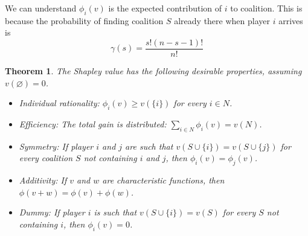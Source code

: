 \documentclass[12pt]{article}
\newtheorem{theorem}{Theorem}[section]
\theoremstyle{definition}
\begin{document}
We can understand $\phi_i(v)$ is the expected contribution of $i$ to coalition. This is because the probability of finding coalition $S$ already there when player $i$ arrives is
\[
\gamma(s)=\frac{s!(n-s-1)!}{n!}
\]
\begin{theorem}\normalfont The Shapley value has the following desirable properties, assuming $v(\varnothing)=0$.
\begin{itemize}
  \item Individual rationality: $\phi_i(v)\geq v(\{i\})$ for every $i\in N$.
  \item Efficiency: The total gain is distributed: $\sum_{i\in N}\phi_i(v)=v(N)$.
  \item Symmetry: If player $i$ and $j$ are such that $v(S\cup\{i\})=v(S\cup\{j\})$ for every coalition $S$ not containing $i$ and $j$, then $\phi_i(v)=\phi_j(v)$.
  \item Additivity: If $v$ and $w$ are characteristic functions, then $\phi(v+w)=\phi(v)+\phi(w)$.
  \item Dummy: If player $i$ is such that $v(S\cup\{i\})=v(S)$ for every $S$ not containing $i$, then $\phi_i(v)=0$.
\end{itemize}
\end{theorem}
\end{document}
